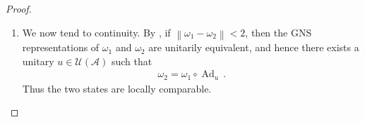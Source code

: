 \documentclass[a4paper,10pt]{article}
\numberwithin{equation}{section}
\theoremstyle{plain}
\theoremstyle{plain}
\theoremstyle{plain}
\theoremstyle{plain}
\theoremstyle{plain}
\theoremstyle{remark}
\theoremstyle{definition}
\newcommand{\calA}{\mathcal{A}}
\newcommand{\calN}{\mathcal{N}}
\newcommand{\calU}{\mathcal{U}}
\newcommand\norm[1]{\left\lVert#1\right\rVert}
\newcommand{\Ad}[1]{\operatorname{Ad}_{#1}}
\newcommand{\eq}[1]{\begin{align*}#1\end{align*}}
\begin{document}
\begin{proof}
\begin{enumerate}
    \begin{align*}
        \calN(\omega_1, \omega_3) &= \omega_1((vu)^* \theta (vu)) \\ 
        &= \langle \Omega_1, \pi(u^*) \pi(v^*) \Theta \pi(v) \Theta \Theta \pi(u) \Theta \Omega_1\rangle \\ 
        &= \langle \Omega_2,  \pi(v^*) \Theta \pi(v) \Theta \Theta \Omega_2 \rangle \\ 
        &= \calN(\omega_1, \omega_2)\langle \Omega_2,  \pi(v^*) \Theta \pi(v) \Theta \Omega_2 \rangle \\  
        &= \calN(\omega_1, \omega_2) \omega_2 (v^* \theta(v)) \\
         &= \calN(\omega_1, \omega_2)\calN(\omega_2, \omega_3)\,.
    \end{align*}
    \item We now tend to continuity. By
    \cite[Corollaries~8 and~9]{GlimmKadison1960}, if
    \(\norm{\omega_1-\omega_2}<2\), then the GNS representations of
    \(\omega_1\) and \(\omega_2\) are unitarily equivalent, and hence
    there exists a unitary \(u\in\calU(\calA)\) such that
    \eq{
        \omega_2=\omega_1\circ\Ad{u}\,.
    }
    Thus the two states are locally comparable.


\end{enumerate}
\end{proof}
\end{document}
